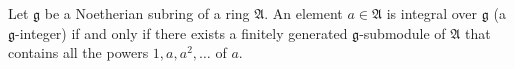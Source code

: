 Let $\mathfrak{g}$ be a Noetherian subring of a ring $\mathfrak{A}$. An element $a \in \mathfrak{A}$ is integral over $\mathfrak{g}$ (a $\mathfrak{g}$-integer) if and only if there exists a finitely generated $\mathfrak{g}$-submodule of $\mathfrak{A}$ that contains all the powers $1, a, a^2, \dots$ of $a$.
